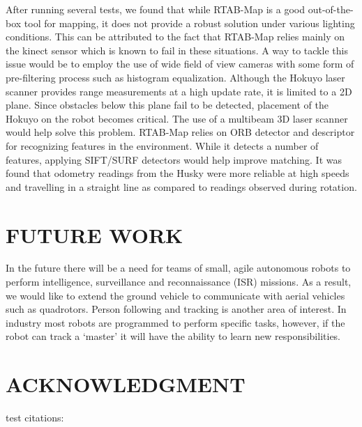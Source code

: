 \documentclass[letterpaper, 10 pt, conference]{ieeeconf}  %
\begin{document}
After running several tests, we found that while RTAB-Map is a good out-of-the-box tool for mapping, it does not provide a robust solution under various lighting conditions. This can be attributed to the fact that RTAB-Map relies mainly on the kinect sensor which is known to fail in these situations. A way to tackle this issue would be to employ the use of wide field of view cameras with some form of pre-filtering process such as histogram equalization.
Although the Hokuyo laser scanner provides range measurements at a high update rate, it is limited to a 2D plane. Since obstacles below this plane fail to be detected, placement of the Hokuyo on the robot becomes critical. The use of a multibeam 3D laser scanner would help solve this problem.
RTAB-Map relies on ORB detector and descriptor for recognizing features in the environment. While it detects a number of features, applying SIFT/SURF detectors would help improve matching. It was found that odometry readings from the Husky were more reliable at high speeds and travelling in a straight line as compared to readings observed during rotation.

\section{FUTURE WORK}

In the future there will be a need for teams of small, agile autonomous robots to perform intelligence, surveillance and reconnaissance (ISR) missions. As a result, we would like to extend the ground vehicle to communicate with aerial vehicles such as quadrotors. Person following and tracking is another area of interest. In industry most robots are programmed to perform specific tasks, however, if the robot can track a \enquote*{master} it will have the ability to learn new responsibilities.

\addtolength{\textheight}{-12cm}   %



\section*{ACKNOWLEDGMENT}

test citations:

~\cite{ORB}
~\cite{target}
~\cite{3Dshape}





\end{document}
